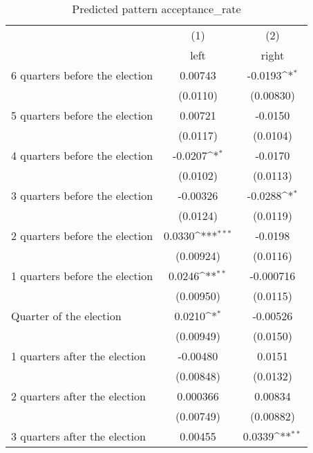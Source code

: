 \begin{table}[htbp]\centering
\def\sym#1{\ifmmode^{#1}\else\(^{#1}\)\fi}
\caption{Predicted pattern acceptance\_rate}
\begin{tabular}{l*{2}{c}}
\hline\hline
                    &\multicolumn{1}{c}{(1)}&\multicolumn{1}{c}{(2)}\\
                    &\multicolumn{1}{c}{left}&\multicolumn{1}{c}{right}\\
\hline
 6 quarters before the election&     0.00743         &     -0.0193\sym{*}  \\
                    &    (0.0110)         &   (0.00830)         \\
[1em]
 5 quarters before the election&     0.00721         &     -0.0150         \\
                    &    (0.0117)         &    (0.0104)         \\
[1em]
 4 quarters before the election&     -0.0207\sym{*}  &     -0.0170         \\
                    &    (0.0102)         &    (0.0113)         \\
[1em]
 3 quarters before the election&    -0.00326         &     -0.0288\sym{*}  \\
                    &    (0.0124)         &    (0.0119)         \\
[1em]
 2 quarters before the election&      0.0330\sym{***}&     -0.0198         \\
                    &   (0.00924)         &    (0.0116)         \\
[1em]
 1 quarters before the election&      0.0246\sym{**} &   -0.000716         \\
                    &   (0.00950)         &    (0.0115)         \\
[1em]
Quarter of the election&      0.0210\sym{*}  &    -0.00526         \\
                    &   (0.00949)         &    (0.0150)         \\
[1em]
 1 quarters after the election&    -0.00480         &      0.0151         \\
                    &   (0.00848)         &    (0.0132)         \\
[1em]
 2 quarters after the election&    0.000366         &     0.00834         \\
                    &   (0.00749)         &   (0.00882)         \\
[1em]
 3 quarters after the election&     0.00455         &      0.0339\sym{**} \\

\end{tabular}
\end{table}
